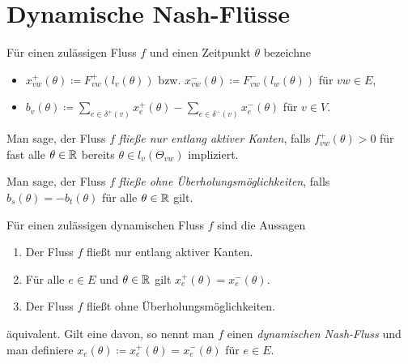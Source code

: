 \section{Dynamische Nash-Flüsse}

\begin{frame}
	\begin{definition}
		Für einen zulässigen Fluss $f$ und einen Zeitpunkt $\theta$ bezeichne
		\begin{itemize}[label=\color{darkblue}$\bullet$]
			\item $x_{vw}^+(\theta)\coloneq  F_{vw}^+(l_v(\theta))$ bzw. $x_{vw}^-(\theta)\coloneq  F^-_{vw}(l_w(\theta))$ für $vw\in E$,
			\pause\item $b_v(\theta) \coloneq  \sum_{e\in\delta^+(v)} x_e^+(\theta) - \sum_{e\in\delta^-(v)} x_e^-(\theta)$ für $v\in V$.
		\end{itemize}
	\end{definition}
	
	\pause\begin{definition}\label{def-flow-along-active-edges}
		Man sage, der Fluss $f$ \emph{fließe nur entlang aktiver Kanten}, falls $f_{vw}^+(\theta) > 0$ für fast alle $\theta\in\mathbb{R}$ bereits $\theta\in l_v(\Theta_{vw})$ impliziert.
	\end{definition}

	\pause\begin{definition}
	Man sage, der Fluss $f$ \emph{fließe ohne Überholungsmöglichkeiten}, falls $b_s(\theta) = -b_t(\theta)$ für alle $\theta\in\mathbb{R}$ gilt.
	\end{definition}
\end{frame}

\begin{frame}
	\begin{theorem}\label{thm-equivalencies-nash-flow}
		Für einen zulässigen dynamischen Fluss $f$ sind die Aussagen
		\begin{enumerate}[label=(\roman*)]
			\item Der Fluss $f$ fließt nur entlang aktiver Kanten.
			\item Für alle $e\in E$ und $\theta\in\mathbb{R}$ gilt $x_e^+(\theta) = x_e^-(\theta)$.
			\item Der Fluss $f$ fließt ohne Überholungsmöglichkeiten.
		\end{enumerate}
		äquivalent. Gilt eine davon, so nennt man $f$ einen \emph{dynamischen Nash-Fluss} und man definiere $x_e(\theta)\coloneq x_e^+(\theta) = x_e^-(\theta)$ für $e\in E$.
	\end{theorem}
\end{frame}